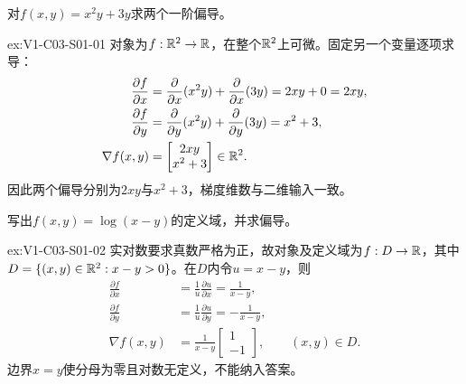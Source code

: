 \begin{SLChapterExercisePairSection}

\begin{exercise}[偏导计算]\label{ex:V1-C03-S01-01}
对$f(x,y)=x^2y+3y$求两个一阶偏导。
\end{exercise}
\label{sol:V1-C03-S01-01}
\begin{chapterexercisesolution}{ex:V1-C03-S01-01}
对象为$f:\mathbb{R}^2\to\mathbb{R}$，在整个$\mathbb{R}^2$上可微。固定另一个变量逐项求导：
\[
\begin{aligned}
\frac{\partial f}{\partial x}
&=\frac{\partial}{\partial x}(x^2y)+\frac{\partial}{\partial x}(3y)
=2xy+0=2xy,\\
\frac{\partial f}{\partial y}
&=\frac{\partial}{\partial y}(x^2y)+\frac{\partial}{\partial y}(3y)
=x^2+3,\\
\nabla f(x,y)&=\begin{bmatrix}2xy\\x^2+3\end{bmatrix}\in\mathbb{R}^2.
\end{aligned}
\]
因此两个偏导分别为$2xy$与$x^2+3$，梯度维数与二维输入一致。
\end{chapterexercisesolution}

\begin{exercise}[定义域]\label{ex:V1-C03-S01-02}
写出$f(x,y)=\log(x-y)$的定义域，并求偏导。
\end{exercise}
\label{sol:V1-C03-S01-02}
\begin{chapterexercisesolution}{ex:V1-C03-S01-02}
实对数要求真数严格为正，故对象及定义域为$f:D\to\mathbb{R}$，其中$D=\{(x,y)\in\mathbb{R}^2:x-y>0\}$。在$D$内令$u=x-y$，则
\[
\begin{aligned}
\frac{\partial f}{\partial x}
&=\frac1u\frac{\partial u}{\partial x}=\frac1{x-y},\\
\frac{\partial f}{\partial y}
&=\frac1u\frac{\partial u}{\partial y}=-\frac1{x-y},\\
\nabla f(x,y)&=\frac1{x-y}\begin{bmatrix}1\\-1\end{bmatrix},
\qquad (x,y)\in D.
\end{aligned}
\]
边界$x=y$使分母为零且对数无定义，不能纳入答案。
\end{chapterexercisesolution}


\end{SLChapterExercisePairSection}
